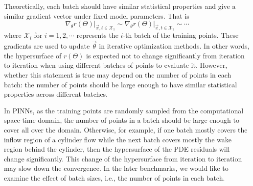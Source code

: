Theoretically, each batch should have similar statistical properties and give a similar gradient vector under fixed model parameters.
That is
\begin{equation}
\left.\nabla_\theta r(\Theta) \right|_{\vec{x}, t \in \mathcal{X}_1} \sim
\left.\nabla_\theta r(\Theta) \right|_{\vec{x}, t \in \mathcal{X}_2} \sim
\cdots
\end{equation}
where $\mathcal{X}_i$ for $i=1,2,\cdots$ represents the $i$-th batch of the training points.
These gradients are used to update $\vec{\theta}$ in iterative optimization methods.
In other words, the hypersurface of $r(\Theta)$ is expected not to change significantly from iteration to iteration when using different batches of points to evaluate it.
However, whether this statement is true may depend on the number of points in each batch: the number of points should be large enough to have similar statistical properties across different batches.

In PINNs, as the training points are randomly sampled from the computational space-time domain, the number of points in a batch should be large enough to cover all over the domain.
Otherwise, for example, if one batch mostly covers the inflow region of a cylinder flow while the next batch covers mostly the wake region behind the cylinder, then the hypersurface of the PDE residuals will change significantly.
This change of the hypersurface from iteration to iteration may slow down the convergence.
In the later benchmarks, we would like to examine the effect of batch sizes, i.e., the number of points in each batch. 

